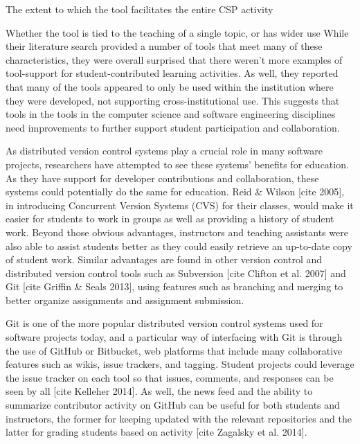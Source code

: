 The extent to which the tool facilitates the entire CSP activity

Whether the tool is tied to the teaching of a single topic, or has wider use
While their literature search provided a number of tools that meet many of these characteristics, they were overall surprised that there weren’t more examples of tool-support for student-contributed learning activities. As well, they reported that many of the tools appeared to only be used within the institution where they were developed, not supporting cross-institutional use. This suggests that tools in the tools in the computer science and software engineering disciplines need improvements to further support student participation and collaboration.

As distributed version control systems play a crucial role in many software projects, researchers have attempted to see these systems’ benefits for education. As they have support for developer contributions and collaboration, these systems could potentially do the same for education. Reid & Wilson [cite 2005], in introducing Concurrent Version Systems (CVS) for their classes, would make it easier for students to work in groups as well as providing a history of student work. Beyond those obvious advantages, instructors and teaching assistants were also able to assist students better as they could easily retrieve an up-to-date copy of student work. Similar advantages are found in other version control and distributed version control tools such as Subversion [cite Clifton et al. 2007] and Git [cite Griffin & Seals 2013], using features such as branching and merging to better organize assignments and assignment submission.

Git is one of the more popular distributed version control systems used for software projects today, and a particular way of interfacing with Git is through the use of GitHub or Bitbucket, web platforms that include many collaborative features such as wikis, issue trackers, and tagging. Student projects could leverage the issue tracker on each tool so that issues, comments, and responses can be seen by all [cite Kelleher 2014]. As well, the news feed and the ability to summarize contributor activity on GitHub can be useful for both students and instructors, the former for keeping updated with the relevant repositories and the latter for grading students based on activity [cite Zagalsky et al. 2014].



